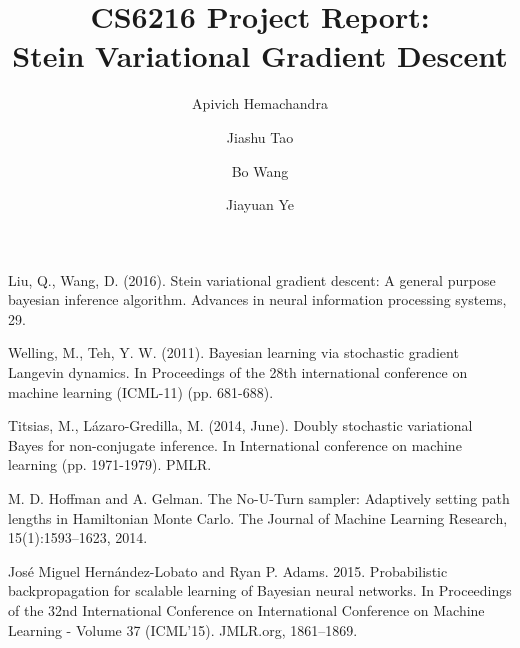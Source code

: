\documentclass[runningheads]{llncs}
\begin{document}
%
\title{CS6216 Project Report: \\Stein Variational Gradient Descent}
%
%
\author{Apivich Hemachandra \and
Jiashu Tao \and
Bo Wang   \and
Jiayuan Ye }
%
%


\maketitle              %
%







%
%
%
% 
% 
%
\begin{thebibliography}{8}
Liu, Q., Wang, D. (2016). Stein variational gradient descent: A general purpose bayesian inference algorithm. Advances in neural information processing systems, 29.

Welling, M., Teh, Y. W. (2011). Bayesian learning via stochastic gradient Langevin dynamics. In Proceedings of the 28th international conference on machine learning (ICML-11) (pp. 681-688).

Titsias, M., Lázaro-Gredilla, M. (2014, June). Doubly stochastic variational Bayes for non-conjugate inference. In International conference on machine learning (pp. 1971-1979). PMLR.

M. D. Hoffman and A. Gelman. The No-U-Turn sampler: Adaptively setting path lengths in Hamiltonian Monte Carlo. The Journal of Machine Learning Research, 15(1):1593–1623, 2014.

José Miguel Hernández-Lobato and Ryan P. Adams. 2015. Probabilistic backpropagation for scalable learning of Bayesian neural networks. In Proceedings of the 32nd International Conference on International Conference on Machine Learning - Volume 37 (ICML'15). JMLR.org, 1861–1869.
\end{thebibliography}

\appendix



\end{document}
